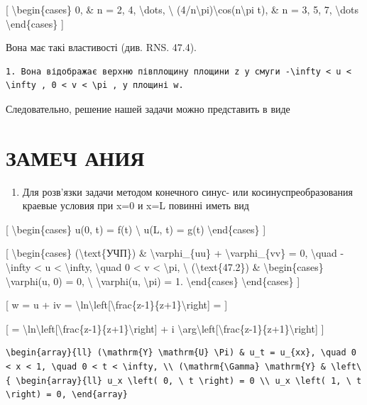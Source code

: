 \documentclass[
]{article}
\providecommand{\tightlist}{%
  \setlength{\itemsep}{0pt}\setlength{\parskip}{0pt}}
\begin{document}
{[} \textbackslash begin\{cases\} 0, \& n = 2, 4, \textbackslash dots,
\textbackslash{}
(4/n\textbackslash pi)\textbackslash cos(n\textbackslash pi t), \& n =
3, 5, 7, \textbackslash dots \textbackslash end\{cases\} {]}

Вона має такі властивості (див. RNS. 47.4).

\begin{verbatim}
1. Вона відображає верхню півплощину площини z у смуги -\infty < u < \infty , 0 < v < \pi , у площині w.
\end{verbatim}

Следовательно, решение нашей задачи можно представить в виде

\section{ЗАМЕЧ
АНИЯ}\label{ux437ux430ux43cux435ux447-ux430ux43dux438ux44f}

\begin{enumerate}
\def\labelenumi{\arabic{enumi}.}
\tightlist
\item
  Для розв'язки задачи методом конечного синус- или
  косинуспреобразования краевые условия при x=0 и x=L повинні иметь вид
\end{enumerate}

{[} \textbackslash begin\{cases\} u(0, t) = f(t) \textbackslash{} u(L,
t) = g(t) \textbackslash end\{cases\} {]}

{[} \textbackslash begin\{cases\} (\textbackslash text\{УЧП\}) \&
\textbackslash varphi\_\{uu\} + \textbackslash varphi\_\{vv\} = 0,
\textbackslash quad -\textbackslash infty \textless{} u \textless{}
\textbackslash infty, \textbackslash quad 0 \textless{} v \textless{}
\textbackslash pi, \textbackslash{} (\textbackslash text\{47.2\}) \&
\textbackslash begin\{cases\} \textbackslash varphi(u, 0) = 0,
\textbackslash{} \textbackslash varphi(u, \textbackslash pi) = 1.
\textbackslash end\{cases\} \textbackslash end\{cases\} {]}

{[} w = u + iv =
\textbackslash ln\textbackslash left{[}\textbackslash frac\{z-1\}\{z+1\}\textbackslash right{]}
= {]}

{[} =
\textbackslash ln\textbackslash left{[}\textbackslash frac\{z-1\}\{z+1\}\textbackslash right{]}
+ i
\textbackslash arg\textbackslash left{[}\textbackslash frac\{z-1\}\{z+1\}\textbackslash right{]}
{]}

\begin{verbatim}
\begin{array}{ll} (\mathrm{Y} \mathrm{U} \Pi) & u_t = u_{xx}, \quad 0 < x < 1, \quad 0 < t < \infty, \\ (\mathrm{\Gamma} \mathrm{Y} & \left\{ \begin{array}{ll} u_x \left( 0, \ t \right) = 0 \\ u_x \left( 1, \ t \right) = 0, \end{array}
\end{verbatim}
\end{document}
